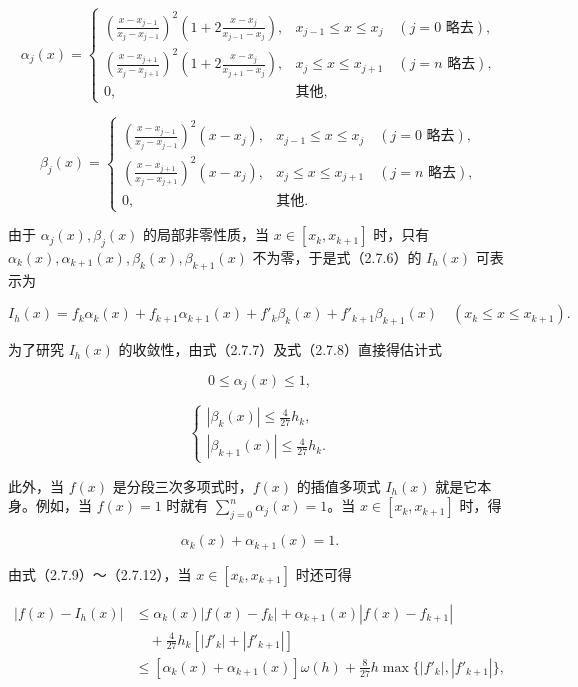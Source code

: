 \documentclass[
  10pt,
  fontset=fandol]{ctexart}
\begin{document}
\[\alpha_j(x)=\begin{cases}
\displaystyle\left(\frac{x-x_{j-1}}{x_j-x_{j-1}}\right)^2\left(1+2\frac{x-x_j}{x_{j-1}-x_j}\right),&x_{j-1}\leqslant x\leqslant x_j\quad(j=0\text{ 略去}),\\[6pt]
\displaystyle\left(\frac{x-x_{j+1}}{x_j-x_{j+1}}\right)^2\left(1+2\frac{x-x_j}{x_{j+1}-x_j}\right),&x_j\leqslant x\leqslant x_{j+1}\quad(j=n\text{ 略去}),\\[6pt]
0,&\text{其他},
\end{cases}\tag{2.7.7}\]

\[\beta_j(x)=\begin{cases}
\displaystyle\left(\frac{x-x_{j-1}}{x_j-x_{j-1}}\right)^2(x-x_j),&x_{j-1}\leqslant x\leqslant x_j\quad(j=0\text{ 略去}),\\[6pt]
\displaystyle\left(\frac{x-x_{j+1}}{x_j-x_{j+1}}\right)^2(x-x_j),&x_j\leqslant x\leqslant x_{j+1}\quad(j=n\text{ 略去}),\\[6pt]
0,&\text{其他}.
\end{cases}\tag{2.7.8}\]

由于 \(\alpha_j(x),\beta_j(x)\) 的局部非零性质，当 \(x\in[x_k,x_{k+1}]\) 时，只有 \(\alpha_k(x),\alpha_{k+1}(x),\beta_k(x),\beta_{k+1}(x)\) 不为零，于是式（2.7.6）的 \(I_h(x)\) 可表示为

\[I_h(x)=f_k\alpha_k(x)+f_{k+1}\alpha_{k+1}(x)+f'_k\beta_k(x)+f'_{k+1}\beta_{k+1}(x)\quad(x_k\leqslant x\leqslant x_{k+1}).\tag{2.7.9}\]

为了研究 \(I_h(x)\) 的收敛性，由式（2.7.7）及式（2.7.8）直接得估计式

\[0\leqslant\alpha_j(x)\leqslant1,\tag{2.7.10}\]

\[\begin{cases}
\displaystyle|\beta_k(x)|\leqslant\frac{4}{27}h_k,\\[6pt]
\displaystyle|\beta_{k+1}(x)|\leqslant\frac{4}{27}h_k.
\end{cases}\tag{2.7.11}\]

此外，当 \(f(x)\) 是分段三次多项式时，\(f(x)\) 的插值多项式 \(I_h(x)\) 就是它本身。例如，当 \(f(x)=1\) 时就有 \(\sum_{j=0}^n\alpha_j(x)=1\)。当 \(x\in[x_k,x_{k+1}]\) 时，得

\[\alpha_k(x)+\alpha_{k+1}(x)=1.\tag{2.7.12}\]

由式（2.7.9）～（2.7.12），当 \(x\in[x_k,x_{k+1}]\) 时还可得

\[\begin{aligned}
|f(x)-I_h(x)|&\leqslant\alpha_k(x)|f(x)-f_k|+\alpha_{k+1}(x)|f(x)-f_{k+1}|\\
&\quad+\frac{4}{27}h_k[|f'_k|+|f'_{k+1}|]\\
&\leqslant[\alpha_k(x)+\alpha_{k+1}(x)]\omega(h)+\frac{8}{27}h\max\{|f'_k|,|f'_{k+1}|\},
\end{aligned}\]
\end{document}
